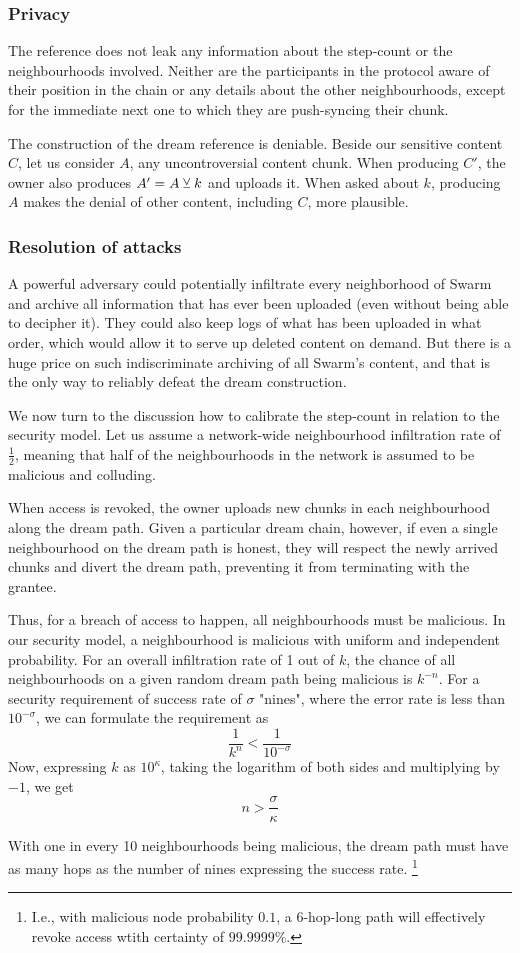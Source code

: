 \subsubsection{Privacy}


The reference does not leak any information about the step-count or the neighbourhoods involved. Neither are the participants in the protocol aware of their position in the chain or any details about the other neighbourhoods, except for the immediate next one to which they are push-syncing their chunk.

The construction of the dream reference is deniable.
Beside our sensitive content $C$, let us consider $A$, any uncontroversial content chunk. When producing $C'$, the owner also produces  $A'=A\veebar k$ and uploads it. When asked about $k$, producing $A$ makes the denial of other content, including $C$, more plausible. 

\subsubsection{Resolution of attacks}


A powerful adversary could potentially infiltrate every neighborhood of Swarm and archive all information that has ever been uploaded (even without being able to decipher it). They could also keep logs of what has been uploaded in what order, which would allow it to serve up deleted content on demand. But there is a huge price on such indiscriminate archiving of all Swarm's content, and that is the only way to reliably defeat the dream construction.

We now turn to the discussion how to calibrate the step-count in relation to the security model. Let us assume a network-wide neighbourhood infiltration rate of $\frac{1}{2}$, meaning that  half of the neighbourhoods in the network is assumed  to be  malicious and colluding. 

When access is revoked, the owner uploads new chunks in each neighbourhood along the dream path. 
Given a particular dream chain, however, if even a single neighbourhood on the dream path is honest, they will respect the newly arrived chunks and divert the dream path, preventing it from terminating with the grantee. 


Thus, for a breach of access to happen, all neighbourhoods must be malicious.
In our security model, a neighbourhood is malicious with  uniform and independent probability.  For an overall infiltration rate of 1 out of $k$, the chance of all neighbourhoods on a given random dream path being malicious is $k^{-n}$. For a security requirement of success rate of $\sigma$ "nines", where the error rate is less than $10^{-\sigma}$,  we can formulate the requirement as
%
\begin{equation}
    \frac{1}{k^n}< \frac{1}{10^{-\sigma}}
\end{equation}
Now, expressing $k$ as $10^\kappa$, taking the logarithm of both sides and multiplying by $-1$, we get
%
\begin{equation}
    n > \frac{\sigma}{\kappa}
\end{equation}

With one in every 10 neighbourhoods being malicious, the dream path must have as many hops as the number of nines expressing the success rate.%
%
\footnote{I.e., with malicious node probability $0.1$, a 6-hop-long path will effectively revoke access wtith certainty of $99.9999\%$.}
